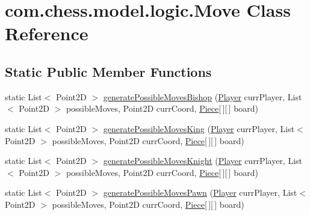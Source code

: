 \hypertarget{classcom_1_1chess_1_1model_1_1logic_1_1_move}{}\section{com.\+chess.\+model.\+logic.\+Move Class Reference}
\label{classcom_1_1chess_1_1model_1_1logic_1_1_move}
\subsection*{Static Public Member Functions}
\begin{DoxyCompactItemize}
\item 
static List$<$ Point2D $>$ \mbox{\hyperlink{classcom_1_1chess_1_1model_1_1logic_1_1_move_a117667e7e123876b4bbdacfa76ba82b1}{generate\+Possible\+Moves\+Bishop}} (\mbox{\hyperlink{classcom_1_1chess_1_1model_1_1logic_1_1_player}{Player}} curr\+Player, List$<$ Point2D $>$ possible\+Moves, Point2D curr\+Coord, \mbox{\hyperlink{classcom_1_1chess_1_1model_1_1pieces_1_1_piece}{Piece}}\mbox{[}$\,$\mbox{]}\mbox{[}$\,$\mbox{]} board)
\item 
static List$<$ Point2D $>$ \mbox{\hyperlink{classcom_1_1chess_1_1model_1_1logic_1_1_move_aac45ded7a0e5f8a48144d38e1e95f18a}{generate\+Possible\+Moves\+King}} (\mbox{\hyperlink{classcom_1_1chess_1_1model_1_1logic_1_1_player}{Player}} curr\+Player, List$<$ Point2D $>$ possible\+Moves, Point2D curr\+Coord, \mbox{\hyperlink{classcom_1_1chess_1_1model_1_1pieces_1_1_piece}{Piece}}\mbox{[}$\,$\mbox{]}\mbox{[}$\,$\mbox{]} board)
\item 
static List$<$ Point2D $>$ \mbox{\hyperlink{classcom_1_1chess_1_1model_1_1logic_1_1_move_abc9f76d539b5717aeb40efa9605729dd}{generate\+Possible\+Moves\+Knight}} (\mbox{\hyperlink{classcom_1_1chess_1_1model_1_1logic_1_1_player}{Player}} curr\+Player, List$<$ Point2D $>$ possible\+Moves, Point2D curr\+Coord, \mbox{\hyperlink{classcom_1_1chess_1_1model_1_1pieces_1_1_piece}{Piece}}\mbox{[}$\,$\mbox{]}\mbox{[}$\,$\mbox{]} board)
\item 
static List$<$ Point2D $>$ \mbox{\hyperlink{classcom_1_1chess_1_1model_1_1logic_1_1_move_af896200842245af97b19284a0bafabe2}{generate\+Possible\+Moves\+Pawn}} (\mbox{\hyperlink{classcom_1_1chess_1_1model_1_1logic_1_1_player}{Player}} curr\+Player, List$<$ Point2D $>$ possible\+Moves, Point2D curr\+Coord, \mbox{\hyperlink{classcom_1_1chess_1_1model_1_1pieces_1_1_piece}{Piece}}\mbox{[}$\,$\mbox{]}\mbox{[}$\,$\mbox{]} board)
\item 

\end{DoxyCompactItemize}
